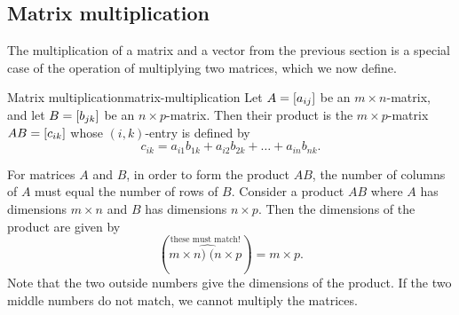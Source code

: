 \subsection{Matrix multiplication}

The multiplication of a matrix and a vector from the previous section
is a special case of the operation of multiplying two matrices, which
we now define.

\begin{definition}{Matrix multiplication}{matrix-multiplication}
  Let $A=\left[a_{ij}\right]$ be an $m\times n$-matrix, and let
  $B=\left[b_{jk}\right]$ be an $n\times p$-matrix. Then their product%
   is the
  $m\times p$-matrix $AB=\left[c_{ik}\right]$ whose $(i,k)$-entry is defined
  by
  \begin{equation*}
    c_{ik} = a_{i1}b_{1k} + a_{i2}b_{2k} + \ldots + a_{in}b_{nk}.
  \end{equation*}
\end{definition}

For matrices $A$ and $B$, in order to form the product $AB$, the
number of columns of $A$ must equal the number of rows of
$B$. Consider a product $AB$ where $A$ has dimensions $m\times n$ and
$B$ has dimensions $n \times p$. Then the dimensions of the product
are given by
\begin{equation*}
  (\overset{\text{these must match!}}{m\times\widehat{n)\;(n}\times p})=m\times p.
\end{equation*}
Note that the two outside numbers give the dimensions of the
product. If the two middle numbers do not match, we cannot multiply
the matrices.

